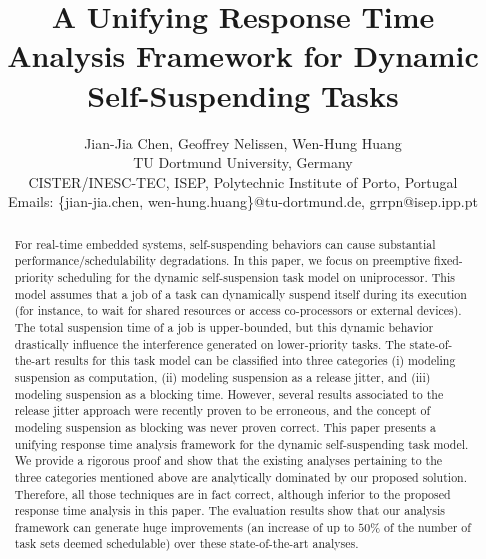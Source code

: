 \documentclass[conference]{IEEEtran}
\begin{document}
  
\title{A Unifying Response Time Analysis Framework for Dynamic Self-Suspending Tasks}

\author{Jian-Jia Chen, Geoffrey Nelissen, Wen-Hung Huang\\
 TU Dortmund University, Germany\\
 CISTER/INESC-TEC, ISEP, Polytechnic Institute of Porto, Portugal \\
Emails: \{jian-jia.chen, wen-hung.huang\}@tu-dortmund.de, grrpn@isep.ipp.pt
}

\maketitle

\begin{abstract}
  For real-time embedded systems, self-suspending behaviors can cause
  substantial performance/schedulability degradations. In this paper,
  we focus on preemptive fixed-priority scheduling for the dynamic
  self-suspension task model on uniprocessor. This
  model assumes that a job of a task can dynamically suspend itself during its execution (for instance, to wait for shared resources or access co-processors or external devices).
  The total suspension time of a job is upper-bounded, but this dynamic behavior drastically influence the interference generated on lower-priority tasks. The state-of-the-art results for this task model can be classified
  into three categories (i) modeling suspension as computation, (ii)
  modeling suspension as a release jitter, and (iii) modeling suspension as a blocking time.
  However, several results associated to the release jitter approach were recently proven to be erroneous, and the concept of modeling suspension as blocking was never
  proven correct. This paper presents a unifying
  response time analysis framework for the dynamic self-suspending
  task model. We provide a rigorous proof and show that the existing analyses pertaining to the three categories mentioned above are analytically dominated by our proposed solution. Therefore, all those techniques are in fact correct, although
  inferior to the proposed response time analysis in this paper. The
  evaluation results show that our analysis framework can generate huge
  improvements (an increase of up to $50\%$ of the number of task sets
  deemed schedulable) over these state-of-the-art analyses.
\end{abstract}
\end{document}
